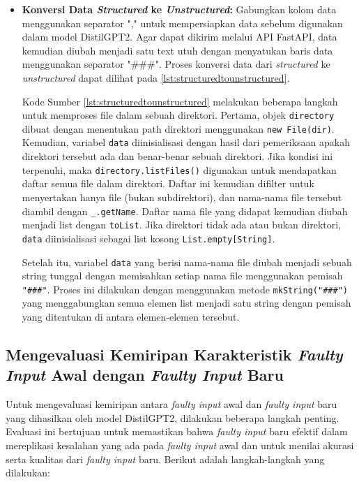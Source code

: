 \begin{itemize}
  \item \textbf{Konversi Data \emph{Structured} ke \emph{Unstructured}:} Gabungkan kolom data menggunakan separator "," untuk mempersiapkan data sebelum digunakan dalam model DistilGPT2.
  Agar dapat dikirim melalui API FastAPI, data kemudian diubah menjadi satu text utuh dengan
  menyatukan baris data menggunakan separator "\#\#\#".
  Proses konversi data dari \emph{structured} ke \emph{unstructured} dapat dilihat pada \ref{lst:structuredtounstructured}.

  

  Kode Sumber \ref{lst:structuredtounstructured} melakukan beberapa langkah untuk memproses file dalam sebuah direktori. Pertama, objek \texttt{directory} dibuat dengan menentukan path direktori menggunakan \texttt{new File(dir)}. Kemudian, variabel \texttt{data} diinisialisasi dengan hasil dari pemeriksaan apakah direktori tersebut ada dan benar-benar sebuah direktori. Jika kondisi ini terpenuhi, maka \texttt{directory.listFiles()} digunakan untuk mendapatkan daftar semua file dalam direktori. Daftar ini kemudian difilter untuk menyertakan hanya file (bukan subdirektori), dan nama-nama file tersebut diambil dengan \texttt{\_.getName}. Daftar nama file yang didapat kemudian diubah menjadi list dengan \texttt{toList}. Jika direktori tidak ada atau bukan direktori, \texttt{data} diinisialisasi sebagai list kosong \texttt{List.empty[String]}.

  Setelah itu, variabel \texttt{data} yang berisi nama-nama file diubah menjadi sebuah string tunggal dengan memisahkan setiap nama file menggunakan pemisah \texttt{"\#\#\#"}. Proses ini dilakukan dengan menggunakan metode \texttt{mkString("\#\#\#")} yang menggabungkan semua elemen list menjadi satu string dengan pemisah yang ditentukan di antara elemen-elemen tersebut.


\end{itemize}

\subsection{Mengevaluasi Kemiripan Karakteristik 
\emph{Faulty Input} Awal dengan \emph{Faulty Input} Baru}
\label{sec:mengevaluasikemiripan}

Untuk mengevaluasi kemiripan antara \emph{faulty input} awal dan \emph{faulty input} baru yang dihasilkan oleh model DistilGPT2, dilakukan beberapa langkah penting. Evaluasi ini bertujuan untuk memastikan bahwa \emph{faulty input} baru efektif dalam mereplikasi kesalahan yang ada pada \emph{faulty input} awal dan untuk menilai akurasi serta kualitas dari \emph{faulty input} baru. Berikut adalah langkah-langkah yang dilakukan:

